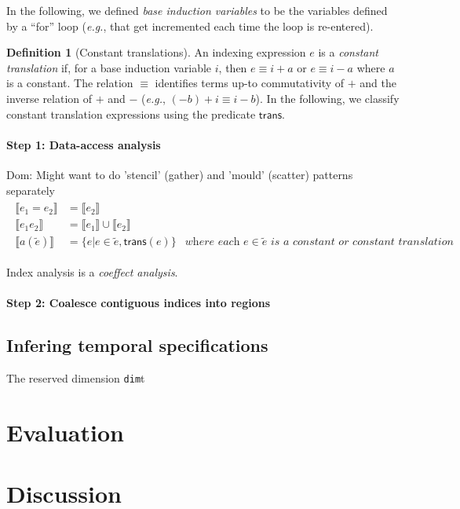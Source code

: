 \documentclass[10pt]{sigplanconf}
\newcommand{\dnote}[1]{\textcolor{darkpurple}{Dom: #1}}
\newcounter{block}
\theoremstyle{definition}
\newtheorem{definition}[block]{Definition}
\newcommand{\eg}{\emph{e.g.}}
\newcommand{\dimId}{\texttt{dim}}
\newcommand{\interp}[1]{\llbracket{#1}\rrbracket}
\begin{document}
In the following, we defined
\emph{base induction variables} to be the variables
 defined by a ``for'' loop (\eg{}, that get incremented each time the
loop is re-entered). 

\begin{definition}[Constant translations]
An indexing expression $e$ is a \emph{constant translation} if,
for a base induction variable $i$, then $e \equiv i + a$ or $e \equiv i - a$ 
where $a$ is a constant. The relation $\equiv$ identifies terms
up-to commutativity of $+$ and the inverse
relation of $+$ and $-$ (\eg{}, $(-b) + i \equiv i - b$). 
In the following, we classify constant translation expressions 
using the predicate $\textsf{trans}$.
\end{definition}

\paragraph{Step 1: Data-access analysis}

\dnote{Might want to do 'stencil' (gather) and 'mould' (scatter)
  patterns separately}
\begin{align*}
\begin{array}{lll}
\interp{e_1 = e_2}    & = \interp{e_2} \\
\interp{e_1 e_2}      & = \interp{e_1} \cup \interp{e_2} \\
\interp{a(\tilde{e})} & = \{e | e \in \tilde{e}, \textsf{trans}(e)\} & \textit{where each $e \in
                                          \tilde{e}$ is a constant or constant translation}
\end{array}
\end{align*}

Index analysis is a \emph{coeffect analysis}.

\paragraph{Step 2: Coalesce contiguous indices into regions}


\subsection{Infering temporal specifications}

The reserved dimension \dimId{t}

\section{Evaluation}

\section{Discussion}



\end{document}

